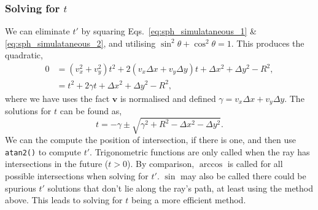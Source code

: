 \documentclass{article}
\let\vec \bm
\begin{document}
\subsubsection{Solving for $t$}
We can eliminate $t'$ by squaring Eqs.~\ref{eq:sph_simulataneous_1} \& \ref{eq:sph_simulataneous_2}, and utilising $\sin^2 \theta + \cos^2 \theta = 1$. This produces the quadratic,
\begin{align}
    0
    &=
    (v_x^2 + v_y^2)t^2
    +
    2(v_x \Delta x + v_y \Delta y)t
    +
    \Delta x^2 + \Delta y^2 - R^2, \\
    &=
    t^2
    +
    2 \gamma t
    +
    \Delta x^2 + \Delta y^2 - R^2,
\end{align}
where we have uses the fact $\vec{v}$ is normalised and defined $\gamma = v_x \Delta x + v_y \Delta y$. The solutions for $t$ can be found as,
\begin{equation}
    t
    =
    -\gamma
    \pm
    \sqrt{\gamma^2 + R^2 - \Delta x^2 - \Delta y^2}.
\end{equation}
We can the compute the position of intersection, if there is one, and then use \texttt{atan2()} to compute $t'$. Trigonometric functions are only called when the ray has intersections in the future ($t>0$). By comparison, $\arccos$ is called for all possible intersections when solving for $t'$. $\sin$ may also be called there could be spurious $t'$ solutions that don't lie along the ray's path, at least using the method above. This leads to solving for $t$ being a more efficient method.
\end{document}
